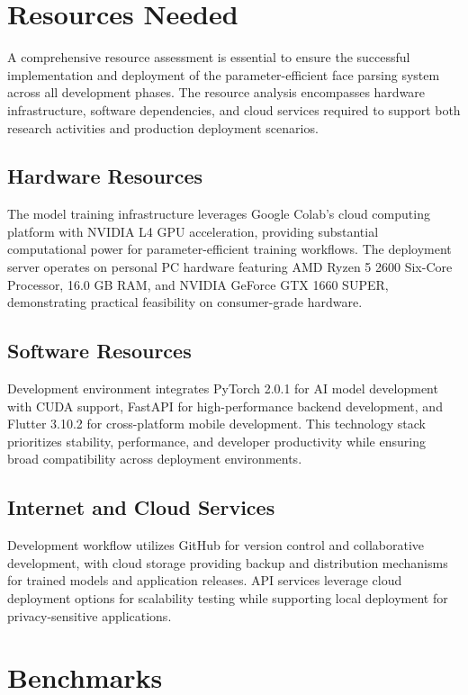 \documentclass[12pt,a4paper]{report}
\begin{document}
\section{Resources Needed}

A comprehensive resource assessment is essential to ensure the successful implementation and deployment of the parameter-efficient face parsing system across all development phases. The resource analysis encompasses hardware infrastructure, software dependencies, and cloud services required to support both research activities and production deployment scenarios.

\subsection{Hardware Resources}

The model training infrastructure leverages Google Colab's cloud computing platform with NVIDIA L4 GPU acceleration, providing substantial computational power for parameter-efficient training workflows. The deployment server operates on personal PC hardware featuring AMD Ryzen 5 2600 Six-Core Processor, 16.0 GB RAM, and NVIDIA GeForce GTX 1660 SUPER, demonstrating practical feasibility on consumer-grade hardware.

\subsection{Software Resources}

Development environment integrates PyTorch 2.0.1 for AI model development with CUDA support, FastAPI for high-performance backend development, and Flutter 3.10.2 for cross-platform mobile development. This technology stack prioritizes stability, performance, and developer productivity while ensuring broad compatibility across deployment environments.

\subsection{Internet and Cloud Services}

Development workflow utilizes GitHub for version control and collaborative development, with cloud storage providing backup and distribution mechanisms for trained models and application releases. API services leverage cloud deployment options for scalability testing while supporting local deployment for privacy-sensitive applications.

\section{Benchmarks}
\end{document}
